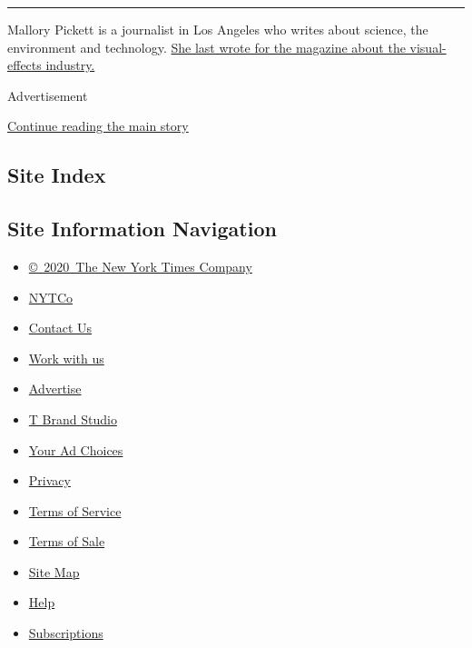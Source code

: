 \begin{center}\rule{0.5\linewidth}{\linethickness}\end{center}

Mallory Pickett is a journalist in Los Angeles who writes about science,
the environment and technology.
\href{https://www.nytimes3xbfgragh.onion/2017/05/04/magazine/why-hollywoods-most-thrilling-scenes-are-now-orchestrated-thousands-of-miles-away.html}{She
last wrote for the magazine about the visual-effects industry.}

Advertisement

\protect\hyperlink{after-bottom}{Continue reading the main story}

\hypertarget{site-index}{%
\subsection{Site Index}\label{site-index}}

\hypertarget{site-information-navigation}{%
\subsection{Site Information
Navigation}\label{site-information-navigation}}

\begin{itemize}
\tightlist
\item
  \href{https://help.nytimes3xbfgragh.onion/hc/en-us/articles/115014792127-Copyright-notice}{©~2020~The
  New York Times Company}
\end{itemize}

\begin{itemize}
\tightlist
\item
  \href{https://www.nytco.com/}{NYTCo}
\item
  \href{https://help.nytimes3xbfgragh.onion/hc/en-us/articles/115015385887-Contact-Us}{Contact
  Us}
\item
  \href{https://www.nytco.com/careers/}{Work with us}
\item
  \href{https://nytmediakit.com/}{Advertise}
\item
  \href{http://www.tbrandstudio.com/}{T Brand Studio}
\item
  \href{https://www.nytimes3xbfgragh.onion/privacy/cookie-policy\#how-do-i-manage-trackers}{Your
  Ad Choices}
\item
  \href{https://www.nytimes3xbfgragh.onion/privacy}{Privacy}
\item
  \href{https://help.nytimes3xbfgragh.onion/hc/en-us/articles/115014893428-Terms-of-service}{Terms
  of Service}
\item
  \href{https://help.nytimes3xbfgragh.onion/hc/en-us/articles/115014893968-Terms-of-sale}{Terms
  of Sale}
\item
  \href{https://spiderbites.nytimes3xbfgragh.onion}{Site Map}
\item
  \href{https://help.nytimes3xbfgragh.onion/hc/en-us}{Help}
\item
  \href{https://www.nytimes3xbfgragh.onion/subscription?campaignId=37WXW}{Subscriptions}
\end{itemize}
